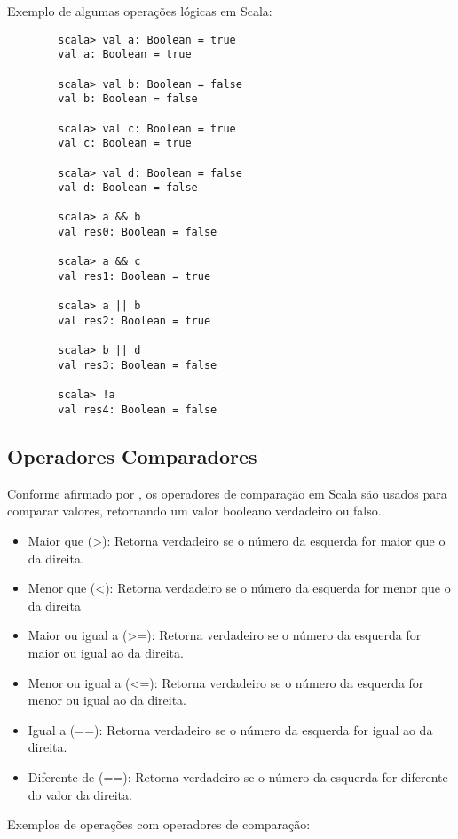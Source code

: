 	Exemplo de algumas opera\c{c}\~{o}es l\'{o}gicas em Scala:
	\begin{lstlisting}
		scala> val a: Boolean = true
		val a: Boolean = true
		
		scala> val b: Boolean = false
		val b: Boolean = false
		
		scala> val c: Boolean = true
		val c: Boolean = true
		
		scala> val d: Boolean = false
		val d: Boolean = false
		
		scala> a && b
		val res0: Boolean = false
		
		scala> a && c
		val res1: Boolean = true
		
		scala> a || b
		val res2: Boolean = true
		
		scala> b || d
		val res3: Boolean = false
		
		scala> !a
		val res4: Boolean = false
	\end{lstlisting}

	\subsection{Operadores Comparadores}
	
	Conforme afirmado por \cite{Odersky}, os operadores de compara\c{c}\~{a}o em Scala s\~{a}o usados para comparar valores, retornando um valor booleano verdadeiro ou falso.
	
	\begin{itemize}
		\item Maior que (>): Retorna verdadeiro se o n\'{u}mero da esquerda for maior que o da direita.
		\item Menor que (<): Retorna verdadeiro se o n\'{u}mero da esquerda for menor que o da direita
		\item Maior ou igual a (>=): Retorna verdadeiro se o n\'{u}mero da esquerda for maior ou igual ao da direita.
		\item Menor ou igual a (<=): Retorna verdadeiro se o n\'{u}mero da esquerda for menor ou igual ao da direita.
		\item Igual a (==): Retorna verdadeiro se o n\'{u}mero da esquerda for igual ao da direita.
		\item Diferente de (==): Retorna verdadeiro se o n\'{u}mero da esquerda for diferente do valor da direita.
	\end{itemize}

	Exemplos de opera\c{c}\~{o}es com operadores de compara\c{c}\~{a}o:
	
